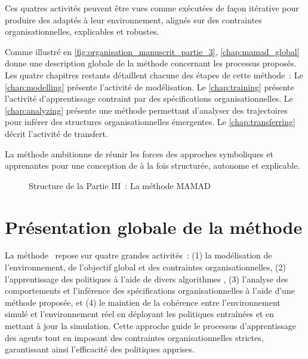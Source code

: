 \noindent
Ces quatres activités peuvent être vues comme exécutées de façon itérative pour produire des  adaptés à leur environnement, alignés sur des contraintes organisationnelles, explicables et robustes.

\medskip

\noindent
Comme illustré en \autoref{fig:organisation_manuscrit_partie_3}, \autoref{chap:mamad_global} donne une description globale de la méthode concernant les processus proposés. Les quatre chapitres restants détaillent chacune des étapes de cette méthode~:
Le \autoref{chap:modelling} présente l'activité de modélisation.
Le \autoref{chap:training} présente l'activité d'apprentissage contraint par des spécifications organisationnelles.
Le \autoref{chap:analyzing} présente une méthode permettant d'analyser des trajectoires pour inférer des structures organisationnelles émergentes.
Le \autoref{chap:transferring} décrit l'activité de transfert.

La méthode  ambitionne de réunir les forces des approches symboliques et apprenantes pour une conception de  à la fois structurée, autonome et explicable.

\begin{figure}[h!]
  \centering
  \resizebox{0.8\linewidth}{!}{%
    
  }
  \caption{Structure de la Partie III~: La méthode MAMAD}
  \label{fig:organisation_manuscrit_partie_3}
\end{figure}



\clearpage
\thispagestyle{empty}
\null
\newpage

\chapter{Présentation globale de la méthode}
\label{chap:mamad_global}

La méthode ~\footnotemark[2] repose sur quatre grandes activités~: (1) la modélisation de l'environnement, de l'objectif global et des contraintes organisationnelles, (2) l'apprentissage des politiques à l'aide de divers algorithmes , (3) l'analyse des comportements et l'inférence des spécifications organisationnelles à l'aide d'une méthode proposée, et (4) le maintien de la cohérence entre l'environnement simulé et l'environnement réel en déployant les politiques entraînées et en mettant à jour la simulation. Cette approche guide le processus d'apprentissage des agents tout en imposant des contraintes organisationnelles strictes, garantissant ainsi l'efficacité des politiques apprises.

